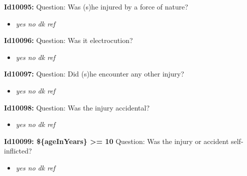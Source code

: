 \documentclass{article}%
\begin{document}
\textbf{Id10095: \newline%
}%
Question: Was (s)he injured by a force of nature?\newline%
%
\begin{itemize}%
\item%
\textit{yes\newline%
 no\newline%
 dk\newline%
 ref\newline%
}%
\end{itemize}%
\textbf{Id10096: \newline%
}%
Question: Was it electrocution?\newline%
%
\begin{itemize}%
\item%
\textit{yes\newline%
 no\newline%
 dk\newline%
 ref\newline%
}%
\end{itemize}%
\textbf{Id10097: \newline%
}%
Question: Did (s)he encounter any other injury?\newline%
%
\begin{itemize}%
\item%
\textit{yes\newline%
 no\newline%
 dk\newline%
 ref\newline%
}%
\end{itemize}%
\textbf{Id10098: \newline%
}%
Question: Was the injury accidental?\newline%
%
\begin{itemize}%
\item%
\textit{yes\newline%
 no\newline%
 dk\newline%
 ref\newline%
}%
\end{itemize}%
\textbf{Id10099: \$\{ageInYears\} >= 10\newline%
}%
Question: Was the injury or accident self{-}inflicted?\newline%
%
\begin{itemize}%
\item%
\textit{yes\newline%
 no\newline%
 dk\newline%
 ref\newline%
}%
\end{itemize}%
\end{document}
